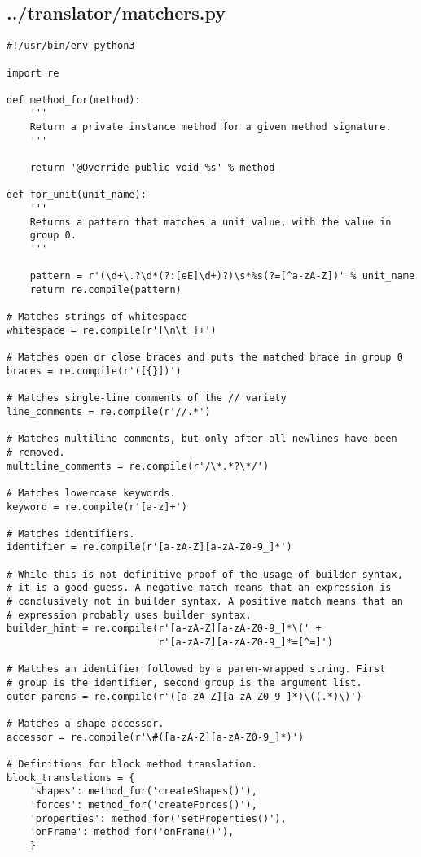 \subsection*{../translator/matchers.py}
\begin{lstlisting}
#!/usr/bin/env python3

import re

def method_for(method):
    '''
    Return a private instance method for a given method signature.
    '''

    return '@Override public void %s' % method

def for_unit(unit_name):
    '''
    Returns a pattern that matches a unit value, with the value in
    group 0.
    '''

    pattern = r'(\d+\.?\d*(?:[eE]\d+)?)\s*%s(?=[^a-zA-Z])' % unit_name
    return re.compile(pattern)

# Matches strings of whitespace
whitespace = re.compile(r'[\n\t ]+')

# Matches open or close braces and puts the matched brace in group 0
braces = re.compile(r'([{}])')

# Matches single-line comments of the // variety
line_comments = re.compile(r'//.*')

# Matches multiline comments, but only after all newlines have been
# removed.
multiline_comments = re.compile(r'/\*.*?\*/')

# Matches lowercase keywords.
keyword = re.compile(r'[a-z]+')

# Matches identifiers.
identifier = re.compile(r'[a-zA-Z][a-zA-Z0-9_]*')

# While this is not definitive proof of the usage of builder syntax,
# it is a good guess. A negative match means that an expression is
# conclusively not in builder syntax. A positive match means that an
# expression probably uses builder syntax.
builder_hint = re.compile(r'[a-zA-Z][a-zA-Z0-9_]*\(' +
                          r'[a-zA-Z][a-zA-Z0-9_]*=[^=]')

# Matches an identifier followed by a paren-wrapped string. First
# group is the identifier, second group is the argument list.
outer_parens = re.compile(r'([a-zA-Z][a-zA-Z0-9_]*)\((.*)\)')

# Matches a shape accessor.
accessor = re.compile(r'\#([a-zA-Z][a-zA-Z0-9_]*)')

# Definitions for block method translation.
block_translations = {
    'shapes': method_for('createShapes()'),
    'forces': method_for('createForces()'),
    'properties': method_for('setProperties()'),
    'onFrame': method_for('onFrame()'),
    }
\end{lstlisting}

